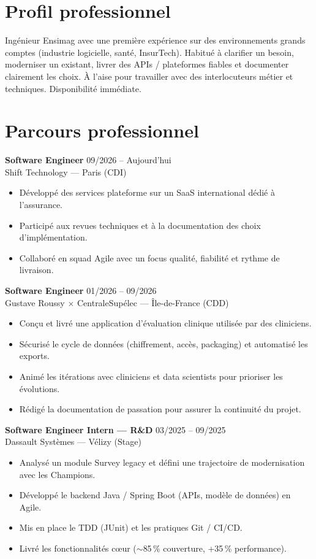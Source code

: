 \documentclass[10pt,a4paper]{article}
\begin{document}
\section*{Profil professionnel}
Ingénieur Ensimag avec une première expérience sur des environnements grands comptes
(industrie logicielle, santé, InsurTech). Habitué à clarifier un besoin, moderniser un
existant, livrer des APIs / plateformes fiables et documenter clairement les choix.
À l'aise pour travailler avec des interlocuteurs métier et techniques.
Disponibilité immédiate.

\section*{Parcours professionnel}

\noindent\textbf{Software Engineer} \hfill 09/2026 -- Aujourd'hui\\
{\small Shift Technology --- Paris (CDI)}
\begin{itemize}
  \item Développé des services plateforme sur un SaaS international dédié à l'assurance.
  \item Participé aux revues techniques et à la documentation des choix d'implémentation.
  \item Collaboré en squad Agile avec un focus qualité, fiabilité et rythme de livraison.
\end{itemize}

\noindent\textbf{Software Engineer} \hfill 01/2026 -- 09/2026\\
{\small Gustave Roussy $\times$ CentraleSupélec --- Île-de-France (CDD)}
\begin{itemize}
  \item Conçu et livré une application d'évaluation clinique utilisée par des cliniciens.
  \item Sécurisé le cycle de données (chiffrement, accès, packaging) et automatisé les exports.
  \item Animé les itérations avec cliniciens et data scientists pour prioriser les évolutions.
  \item Rédigé la documentation de passation pour assurer la continuité du projet.
\end{itemize}

\noindent\textbf{Software Engineer Intern --- R\&D} \hfill 03/2025 -- 09/2025\\
{\small Dassault Systèmes --- Vélizy (Stage)}
\begin{itemize}
  \item Analysé un module Survey legacy et défini une trajectoire de modernisation avec les Champions.
  \item Développé le backend Java / Spring Boot (APIs, modèle de données) en Agile.
  \item Mis en place le TDD (JUnit) et les pratiques Git / CI/CD.
  \item Livré les fonctionnalités cœur ($\sim$85\,\% couverture, +35\,\% performance).
\end{itemize}
\end{document}
